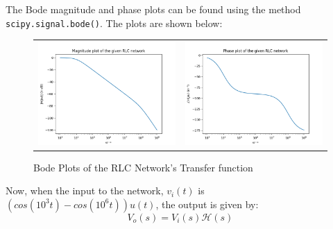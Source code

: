 \documentclass[11pt, a4paper, twoside]{article}
\begin{document}
    The Bode magnitude and phase plots can be found using the method \texttt{scipy.signal.bode()}. The plots are shown below:
    \begin{figure}[H]
        \centering
        \setlength\tabcolsep{2pt}
        \begin{tabular}{cc}
            \includegraphics[scale=0.5]{Fig 5(a).png} &
            \includegraphics[scale=0.5]{Fig 5(b).png}\\
        \end{tabular}
        \caption{Bode Plots of the RLC Network's Transfer function}
    \end{figure}

    Now, when the input to the network, $v_i(t)$ is $(cos(10^3t)-cos(10^6t))u(t)$, the output is given by:
    \begin{equation*}
        V_o(s) = V_i(s)\mathcal{H}(s)
    \end{equation*}
\end{document}

